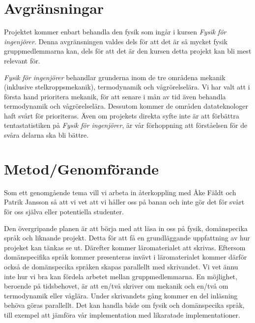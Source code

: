 \documentclass[12pt,a4paper]{article}
\begin{document}
\section{Avgränsningar}

Projektet kommer enbart behandla den fysik som ingår i kursen \textit{Fysik för ingenjörer}. Denna avgränsningen valdes dels för att det är så mycket fysik gruppmedlemmarna kan, dels för att det är den kursen detta projekt kan bli mest relevant för.

\textit{Fysik för ingenjörer} behandlar grunderna inom de tre områdena mekanik (inklusive stelkroppsmekanik), termodynamik och vågrörelselära. Vi har valt att i första hand prioritera mekanik, för att senare i mån av tid även behandla termodynamik och vågrörelselära. Dessutom kommer de områden datateknologer haft svårt för prioriteras. Även om projekets direkta syfte inte är att förbättra tentastatistiken på \textit{Fysik för ingenjörer}, är vår förhoppning att förståelsen för de svåra delarna ska bli bättre.





\section{Metod/Genomförande}

Som ett genomgående tema vill vi arbeta in återkoppling med Åke Fäldt och Patrik Jansson så att vi vet att vi håller oss på banan och inte gör det för svårt för oss själva eller potentiella studenter.

Den övergripande planen är att börja med att läsa in oss på fysik, domänspecika språk och liknande projekt. Detta för att få en grundläggande uppfattning av hur projeket kan tänkas se ut. Därefter kommer läromaterialet att skrivas. Eftersom domänspecifika språk kommer presenteras invävt i läromaterialet kommer därför också de domänspecika språken skapas parallellt med skrivandet. Vi vet ännu inte hur vi bra kan fördela arbetet mellan gruppmedlemmarna. En möjlighet, beroende på tidsbehovet, är att en/två skriver om mekanik och en/två om termodynamik eller våglära. Under skrivandets gång kommer en del inläsning behöva göras parallellt. Det kan handla både om fysik och domänspecika språk, till exempel att jämföra vår implementation med likaratade implementationer.
\end{document}

